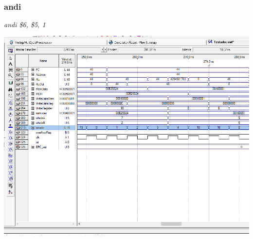 \documentclass{article}
\begin{document}
    \\
    \subsubsection{andi}
    {\it andi \$6, \$5, 1}\\
    \begin{center}
        \includegraphics[scale=0.25]{andi.PNG}
    \end{center}
    
    \\
\end{document}
